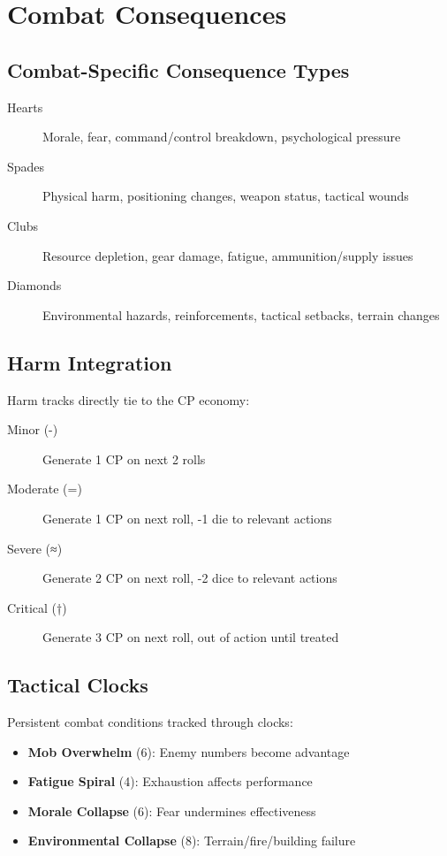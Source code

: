 \section{Combat Consequences}

\subsection*{Combat-Specific Consequence Types}
\begin{description}
  \item[Hearts] Morale, fear, command/control breakdown, psychological pressure
  \item[Spades] Physical harm, positioning changes, weapon status, tactical wounds
  \item[Clubs] Resource depletion, gear damage, fatigue, ammunition/supply issues
  \item[Diamonds] Environmental hazards, reinforcements, tactical setbacks, terrain changes
\end{description}

\subsection*{Harm Integration}
Harm tracks directly tie to the CP economy:
\begin{description}
  \item[Minor (-)] Generate 1 CP on next 2 rolls
  \item[Moderate (=)] Generate 1 CP on next roll, -1 die to relevant actions
  \item[Severe (≈)] Generate 2 CP on next roll, -2 dice to relevant actions  
  \item[Critical (†)] Generate 3 CP on next roll, out of action until treated
\end{description}

\subsection*{Tactical Clocks}
Persistent combat conditions tracked through clocks:
\begin{itemize}
  \item \textbf{Mob Overwhelm} (6): Enemy numbers become advantage
  \item \textbf{Fatigue Spiral} (4): Exhaustion affects performance
  \item \textbf{Morale Collapse} (6): Fear undermines effectiveness
  \item \textbf{Environmental Collapse} (8): Terrain/fire/building failure
\end{itemize}

